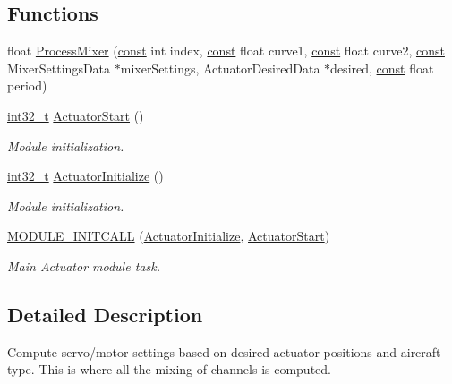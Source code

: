 \subsection*{Functions}
\begin{DoxyCompactItemize}
\item 
float \hyperlink{group___actuator_module_ga844186186b03b96244af3ad5e1a88f02}{Process\-Mixer} (\hyperlink{group___n_a_m_e_ga7ae6d0e43244213b34de2c2b9aa30da6}{const} int index, \hyperlink{group___n_a_m_e_ga7ae6d0e43244213b34de2c2b9aa30da6}{const} float curve1, \hyperlink{group___n_a_m_e_ga7ae6d0e43244213b34de2c2b9aa30da6}{const} float curve2, \hyperlink{group___n_a_m_e_ga7ae6d0e43244213b34de2c2b9aa30da6}{const} Mixer\-Settings\-Data $\ast$mixer\-Settings, Actuator\-Desired\-Data $\ast$desired, \hyperlink{group___n_a_m_e_ga7ae6d0e43244213b34de2c2b9aa30da6}{const} float period)
\item 
\hyperlink{group___n_a_m_e_gafd12020da5a235dfcf0c3c748fb5baed}{int32\-\_\-t} \hyperlink{group___actuator_module_gacde7d1a4e7c4969a5b11e37315053034}{Actuator\-Start} ()
\begin{DoxyCompactList}\small\item\em Module initialization. \end{DoxyCompactList}\item 
\hyperlink{group___n_a_m_e_gafd12020da5a235dfcf0c3c748fb5baed}{int32\-\_\-t} \hyperlink{group___actuator_module_gaa23ed2bf1c2252218764708ac5d8b2fb}{Actuator\-Initialize} ()
\begin{DoxyCompactList}\small\item\em Module initialization. \end{DoxyCompactList}\item 
\hyperlink{group___actuator_module_ga3fc102c0bb02fa6b86182b6230765ca5}{M\-O\-D\-U\-L\-E\-\_\-\-I\-N\-I\-T\-C\-A\-L\-L} (\hyperlink{group___actuator_module_gaa23ed2bf1c2252218764708ac5d8b2fb}{Actuator\-Initialize}, \hyperlink{group___actuator_module_gacde7d1a4e7c4969a5b11e37315053034}{Actuator\-Start})
\begin{DoxyCompactList}\small\item\em Main Actuator module task. \end{DoxyCompactList}\end{DoxyCompactItemize}


\subsection{Detailed Description}
Compute servo/motor settings based on desired actuator positions and aircraft type. This is where all the mixing of channels is computed. 

